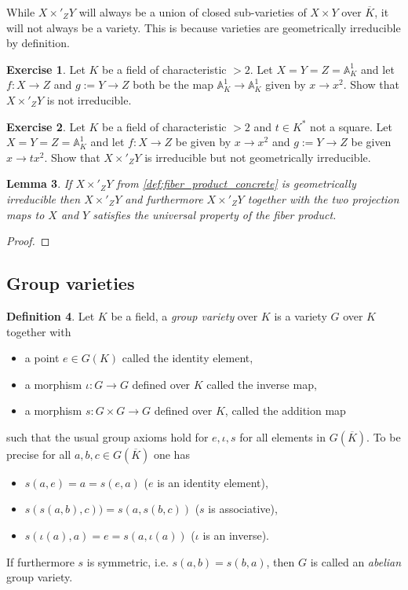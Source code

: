 \documentclass[a4paper,12pt,reqno]{amsart}
\newcommand{\field}[1]{\mathbb{#1}}  %
\newcommand{\A}{\field{A}}
\newtheorem{lemma}{Lemma}
\theoremstyle{definition}
\newtheorem{definition}[lemma]{Definition}
\newtheorem{exercise}[lemma]{Exercise}
\numberwithin{lemma}{section}
\numberwithin{equation}{section}
\numberwithin{figure}{section}
\begin{document}
While $X\times'_Z Y$ will always be a union of closed sub-varieties of $X \times Y$ over $\overline K$, it will not always be a variety. This is because varieties are geometrically irreducible by definition.

\begin{exercise}
Let $K$ be a field of characteristic $>2$.	Let $X = Y = Z = \A^1_K$ and let $f: X \to Z$ and $g := Y\to Z$ both be the map $\A^1_K \to   \A^1_K$ given by $x \to x^2$. Show that $X\times'_Z Y$ is not irreducible.
\end{exercise}

\begin{exercise}
	Let $K$ be a field of characteristic $>2$ and $t \in K^*$ not a square.	Let $X = Y = Z = \A^1_K$ and let $f: X \to Z$ be given by $x \to x^2$ and $g := Y\to Z$ be given $x \to tx^2$. Show that $X\times'_Z Y$ is irreducible but not geometrically irreducible.
\end{exercise}

\begin{lemma}
If $X\times'_Z Y$ from \cref{def:fiber_product_concrete} is geometrically irreducible then $X\times'_Z Y$ and furthermore $X\times'_Z Y$ together with the two projection maps to $X$ and $Y$ satisfies the universal property of the fiber product.
\end{lemma}
\begin{proof}
\end{proof}

\subsection{Group varieties}
\begin{definition}\label{def:group-variety}
Let $K$ be a field, a \textit{group variety} over $K$ is a variety $G$ over $K$ together with 
\begin{itemize}
	\item a point $e \in G(K)$ called the identity element,
	\item a morphism $\iota: G \to G$ defined over $K$ called the inverse map,
	\item a morphism $s: G \times G \to G$ defined over $K$, called the addition map
\end{itemize}
such that the usual group axioms hold for $e, \iota, s$ for all elements in $G(\overline K)$. To be precise for all $a,b,c \in G(\overline K)$ one has
\begin{itemize}
	\item $s(a,e)=a = s(e,a)$ ($e$ is an identity element),
	\item $s(s(a,b),c)) = s(a,s(b,c))$ ($s$ is associative),
	\item $s(\iota(a),a) = e = s(a, \iota(a))$ ($\iota$ is an inverse).
\end{itemize}
If furthermore $s$ is symmetric, i.e. $s(a,b)=s(b,a)$, then $G$ is called an \textit{abelian} group variety.
\end{definition}
\end{document}
